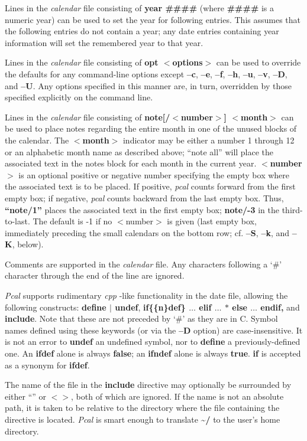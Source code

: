 Lines in the {\it calendar} file consisting of {\bf year \#\#\#\#} (where
{\bf \#\#\#\#} is a numeric year) can be used to set the year for
following entries.  This assumes that the following entries do not
contain a year; any date entries containing year information will set the
remembered year to that year.

Lines in the {\it calendar} file consisting of {\bf opt $<$options$>$}
can be used to override the defaults for any command-line options except
{\bf --c}, {\bf --e}, {\bf --f}, {\bf --h}, {\bf --u}, {\bf --v}, {\bf
--D}, and {\bf --U}.  Any options specified in this manner are, in turn,
overridden by those specified explicitly on the command line.

Lines in the {\it calendar} file consisting of {\bf note[/$<$number$>$]
$<$month$>$} can be used to place notes regarding the entire month in one
of the unused blocks of the calendar.  The {\bf $<$month$>$} indicator
may be either a number 1 through 12 or an alphabetic month name as
described above;  ``note all'' will place the associated text in the
notes block for each month in the current year.  {\bf $<$number$>$} is an
optional positive or negative number specifying the empty box where the
associated text is to be placed.  If positive, {\it pcal} counts forward
from the first empty box; if negative, {\it pcal} counts backward from
the last empty box.  Thus, {\bf ``note/1''} places the associated text in
the first empty box;  {\bf note/-3} in the third-to-last.  The default is
-1 if no $<$number$>$ is given (last empty box, immediately preceding the
small calendars on the bottom row; cf.  {\bf --S}, {\bf --k}, and {\bf
--K}, below).

Comments are supported in the {\it calendar} file.  Any characters
following a `\#' character through the end of the line are ignored.

{\it Pcal} supports rudimentary {\it cpp} -like functionality in the date
file, allowing the following constructs:  {\bf define $|$ undef}, {\bf
if\{\{n\}def\} $\ldots$ elif $\ldots$ $\ast$ else $\ldots$ endif,} and
{\bf include}.  Note that these are not preceded by `\#' as they are in
C.  Symbol names defined using these keywords (or via the {\bf --D}
option) are case-insensitive.  It is not an error to {\bf undef} an
undefined symbol, nor to {\bf define} a previously-defined one.  An {\bf
ifdef} alone is always {\bf false}; an {\bf ifndef} alone is always {\bf
true}.  {\bf if} is accepted as a synonym for {\bf ifdef}.

The name of the file in the {\bf include} directive may optionally be
surrounded by either ``'' or $<$$>$, both of which are ignored.  If the
name is not an absolute path, it is taken to be relative to the directory
where the file containing the directive is located.  {\it Pcal} is smart
enough to translate {\bf \~{}/} to the user's home directory.

